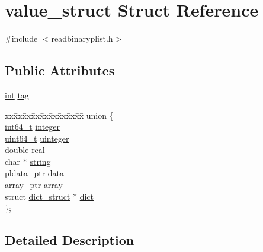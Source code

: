 \hypertarget{structvalue__struct}{}\section{value\+\_\+struct Struct Reference}
\label{structvalue__struct}


{\ttfamily \#include $<$readbinaryplist.\+h$>$}

\subsection*{Public Attributes}
\begin{DoxyCompactItemize}
\item 
\hyperlink{xmltok_8h_a5a0d4a5641ce434f1d23533f2b2e6653}{int} \hyperlink{structvalue__struct_a451c0c45be11ca6802b0d4c6af95f321}{tag}
\item 
\begin{tabbing}
xx\=xx\=xx\=xx\=xx\=xx\=xx\=xx\=xx\=\kill
union \{\\
\>\hyperlink{lib-src_2ffmpeg_2win32_2stdint_8h_a67a9885ef4908cb72ce26d75b694386c}{int64\_t} \hyperlink{structvalue__struct_a49270e9fed428e9ce09ac6188cb160eb}{integer}\\
\>\hyperlink{lib-src_2ffmpeg_2win32_2stdint_8h_aec6fcb673ff035718c238c8c9d544c47}{uint64\_t} \hyperlink{structvalue__struct_a6bbecf5accb53108caa85bef52ddecca}{uinteger}\\
\>double \hyperlink{structvalue__struct_a4ab3629455d6faa852c3d935416b73b8}{real}\\
\>char $\ast$ \hyperlink{structvalue__struct_a743dfc556105c981212ba3df29568370}{string}\\
\>\hyperlink{readbinaryplist_8h_a97710d8098e0a0a309a1d3910a57f395}{pldata\_ptr} \hyperlink{structvalue__struct_a9e6e57b12fdf03e97f4c552d700f5dc2}{data}\\
\>\hyperlink{readbinaryplist_8h_a187622938f42d9de7e516522aed83739}{array\_ptr} \hyperlink{structvalue__struct_a08902e61880b9638a37f9b180face471}{array}\\
\>struct \hyperlink{structdict__struct}{dict\_struct} $\ast$ \hyperlink{structvalue__struct_a86b769cd843831a6abb549dba57d5004}{dict}\\
\}; \\

\end{tabbing}\end{DoxyCompactItemize}


\subsection{Detailed Description}


